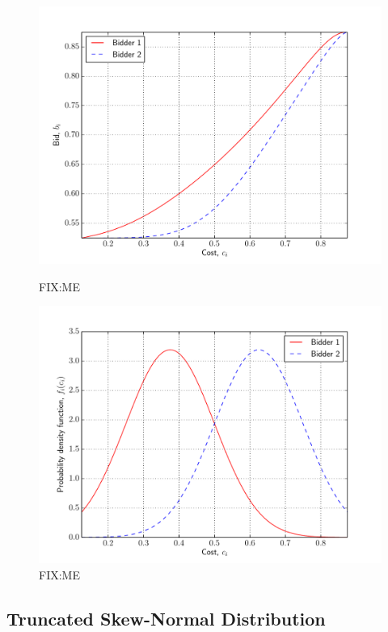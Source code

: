 \begin{figure}[p!]
  \includegraphics[width=\figsize]{Approximation/Figures/test_truncated_normal_bids}
  \caption{FIX:ME}
  \label{fig:test_truncated_normal_bids_approximation}
  \vspace{10mm}
  \includegraphics[width=\figsize]{Approximation/Figures/test_truncated_normal_pdfs}
  \caption{FIX:ME}
  \label{fig:test_truncated_normal_pdfs_approximation}
\end{figure}


\subsection{Truncated Skew-Normal Distribution} %
\label{sub:truncated_skew_normal_distribution_approximation}

